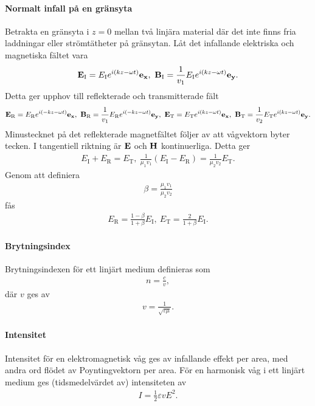 \paragraph{Normalt infall på en gränsyta}
Betrakta en gränsyta i $z = 0$ mellan två linjära material där det inte finns fria laddningar eller strömtätheter på gränsytan. Låt det infallande elektriska och magnetiska fältet vara
\begin{align*}
	\vb{E}_{\text{I}} = E_{\text{I}}e^{i(kz - \omega t)}\ub{x},\ \vb{B}_{\text{I}} = \frac{1}{v_{1}}E_{\text{I}}e^{i(kz - \omega t)}\ub{y}.
\end{align*}
Detta ger upphov till reflekterade och transmitterade fält
\begin{align*}
	\vb{E}_{\text{R}} = E_{\text{R}}e^{i(-kz - \omega t)}\ub{x},\ \vb{B}_{\text{R}} = \frac{1}{v_{1}}E_{\text{R}}e^{i(-kz - \omega t)}\ub{y},\ \vb{E}_{\text{T}} = E_{\text{T}}e^{i(kz - \omega t)}\ub{x},\ \vb{B}_{\text{T}} = \frac{1}{v_{2}}E_{\text{T}}e^{i(kz - \omega t)}\ub{y}.
\end{align*}
Minustecknet på det reflekterade magnetfältet följer av att vågvektorn byter tecken. I tangentiell riktning är $\vb{E}$ och $\vb{H}$ kontinuerliga. Detta ger
\begin{align*}
	E_{\text{I}} + E_{\text{R}} = E_{\text{T}},\ \frac{1}{\mu_{1}v_{1}}(E_{\text{I}} - E_{\text{R}}) = \frac{1}{\mu_{2}v_{2}}E_{\text{T}}.
\end{align*}
Genom att definiera
\begin{align*}
	\beta = \frac{\mu_{1}v_{1}}{\mu_{2}v_{2}}
\end{align*}
fås
\begin{align*}
	E_{\text{R}} = \frac{1 - \beta}{1 + \beta}E_{\text{I}},\ E_{\text{T}} = \frac{2}{1 + \beta}E_{\text{I}}.
\end{align*}

\paragraph{Brytningsindex}
Brytningsindexen för ett linjärt medium definieras som
\begin{align*}
	n = \frac{c}{v},
\end{align*}
där $v$ ges av
\begin{align*}
	v = \frac{1}{\sqrt{\varepsilon\mu}}.
\end{align*}

\paragraph{Intensitet}
Intensitet för en elektromagnetisk våg ges av infallande effekt per area, med andra ord flödet av Poyntingvektorn per area. För en harmonisk våg i ett linjärt medium ges (tidsmedelvärdet av) intensiteten av
\begin{align*}
	I = \frac{1}{2}\varepsilon vE^{2}.
\end{align*}

